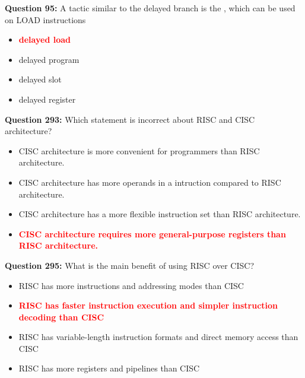 \documentclass[12pt,a4paper]{article}
\begin{document}
\vspace{0.5cm}

\vspace{0.5cm}

\textbf{Question 95:} A tactic similar to the delayed branch is the \underline{\hspace{1.5cm}}, which can be used on LOAD instructions

\begin{itemize}
    \item[\textbf{A.}] \textcolor{red}{\textbf{delayed load}}
    \item[\textbf{B.}] delayed program
    \item[\textbf{C.}] delayed slot
    \item[\textbf{D.}] delayed register
\end{itemize}

\vspace{0.5cm}

\vspace{0.5cm}

\textbf{Question 293:} Which statement is incorrect about RISC and CISC architecture?

\begin{itemize}
    \item[\textbf{A.}] CISC architecture is more convenient for programmers than RISC architecture.
    \item[\textbf{B.}] CISC architecture has more operands in a intruction compared to RISC architecture.
    \item[\textbf{C.}] CISC architecture has a more flexible instruction set than RISC architecture.
    \item[\textbf{D.}] \textcolor{red}{\textbf{CISC architecture requires more general-purpose registers than RISC architecture.}}
\end{itemize}

\vspace{0.5cm}

\vspace{0.5cm}

\textbf{Question 295:} What is the main benefit of using RISC over CISC?

\begin{itemize}
    \item[\textbf{A.}] RISC has more instructions and addressing modes than CISC
    \item[\textbf{B.}] \textcolor{red}{\textbf{RISC has faster instruction execution and simpler instruction decoding than CISC}}
    \item[\textbf{C.}] RISC has variable-length instruction formats and direct memory access than CISC
    \item[\textbf{D.}] RISC has more registers and pipelines than CISC
\end{itemize}
\end{document}
